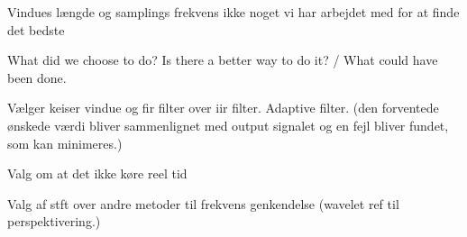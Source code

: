 Vindues længde og samplings frekvens ikke noget vi har arbejdet med for at finde det bedste


What did we choose to do? Is there a better way to do it? / What could have been done.


Vælger keiser vindue og fir filter
over iir filter.
Adaptive filter. (den forventede ønskede værdi bliver sammenlignet med output signalet og en fejl bliver fundet, som kan minimeres.)

Valg om at det ikke køre reel tid


Valg af stft over andre metoder til frekvens genkendelse (wavelet ref til perspektivering.)


